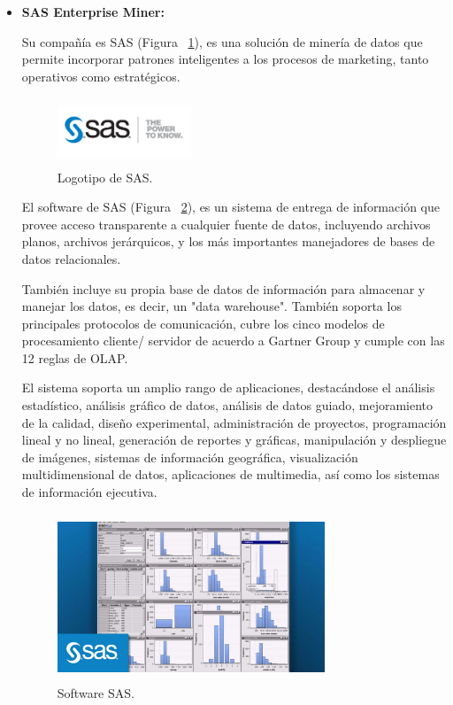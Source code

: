 \documentclass[10pt,journal]{IEEEtran}
\begin{document}
\begin{itemize}
    \item \textbf{SAS Enterprise Miner:} \par
    Su compañía es SAS (Figura ~\ref{f4}), es una solución de minería de datos que permite incorporar patrones inteligentes a los procesos de marketing, tanto operativos como estratégicos. 
    \begin{figure}[H]
        \begin{center}
            \includegraphics[width=4cm, height=2cm]{figuras/4.PNG}
            \caption{Logotipo de SAS.}
            \label{f4} 
         \end{center}
    \end{figure}
    \par El software de SAS (Figura ~\ref{f5}), es un sistema de entrega de información que provee acceso transparente a cualquier fuente de datos, incluyendo archivos planos, archivos jerárquicos, y los más importantes manejadores de bases de datos relacionales.\par También incluye su propia base de datos de información para almacenar y manejar los datos, es decir, un "data warehouse". También soporta los principales protocolos de comunicación, cubre los cinco modelos de procesamiento cliente/ servidor de acuerdo a Gartner Group y cumple con las 12 reglas de OLAP. \par El sistema soporta un amplio rango de aplicaciones, destacándose el análisis estadístico, análisis gráfico de datos, análisis de datos guiado, mejoramiento de la calidad, diseño experimental, administración de proyectos, programación lineal y no lineal, generación de reportes y gráficas, manipulación y despliegue de imágenes, sistemas de información geográfica, visualización multidimensional de datos, aplicaciones de multimedia, así como los sistemas de información ejecutiva.
\begin{figure}[H]
 \begin{center}
       \includegraphics[width=8cm, height=5cm]{figuras/5.JPG}
      \caption{Software SAS.}
      \label{f5} 
      \end{center}
\end{figure}
\end{itemize}
\end{document}
